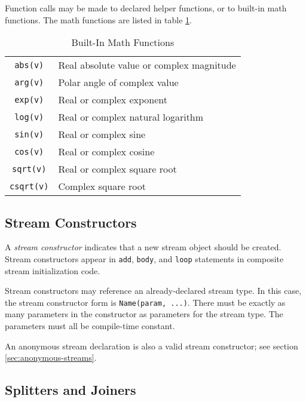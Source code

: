 \documentclass[11pt]{article}
\begin{document}
Function calls may be made to declared helper functions, or to
built-in math functions.  The math functions are listed in table
\ref{tab:math-functions}.

\begin{table}[htbp]
  \begin{center}
    \begin{tabular}{cl}
      \toprule
      \texttt{abs(v)} & Real absolute value or complex magnitude \\
      \texttt{arg(v)} & Polar angle of complex value \\
      \texttt{exp(v)} & Real or complex exponent \\
      \texttt{log(v)} & Real or complex natural logarithm \\
      \texttt{sin(v)} & Real or complex sine \\
      \texttt{cos(v)} & Real or complex cosine \\
      \texttt{sqrt(v)} & Real or complex square root \\
      \texttt{csqrt(v)} & Complex square root \\
      \bottomrule
    \end{tabular}
    \caption{Built-In Math Functions}
    \label{tab:math-functions}
  \end{center}
\end{table}

\subsection{Stream Constructors}
\label{sec:expr-stream-constructor}

A \emph{stream constructor} indicates that a new stream object should
be created.  Stream constructors appear in \texttt{add},
\texttt{body}, and \texttt{loop} statements in composite stream
initialization code.

Stream constructors may reference an already-declared stream type.  In
this case, the stream constructor form is \texttt{Name(param, ...)}.
There must be exactly as many parameters in the constructor as
parameters for the stream type.  The parameters must all be
compile-time constant.

An anonymous stream declaration is also a valid stream constructor;
see section \ref{sec:anonymous-streams}.

\subsection{Splitters and Joiners}
\label{sec:expr-splitters-joiners}
\end{document}
